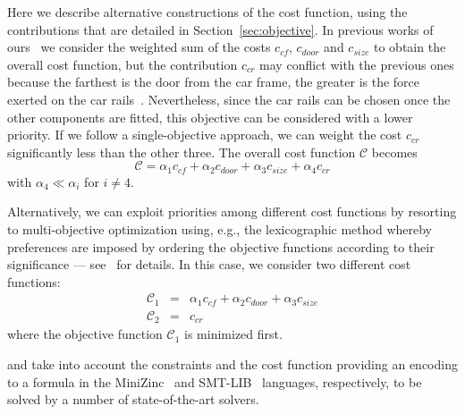 Here we describe alternative constructions of the cost function,
using the contributions that are detailed in Section~\ref{sec:objective}.
In previous works of ours~\cite{AiLift2} we consider the weighted sum 
of the costs $c_{cf}$, $c_{door}$ and $c_{size}$ to obtain the overall
cost function, but the contribution $c_{cr}$ may conflict with the
previous ones because the farthest is the door from the car frame, the
greater is the force exerted on the car rails~\cite{AiLift3, AiLift4}. 
Nevertheless, since the car rails can be chosen once the other components
are fitted, this objective can be considered with a lower priority. 
If we follow a single-objective approach, we can weight the cost $c_{cr}$
significantly less than the other three. The overall cost function
$\mathcal{C}$ becomes
\begin{equation}
	\label{eq:costfunc_single}
	\mathcal{C} = \alpha_1 c_{cf} + \alpha_2 c_{door} +  \alpha_3 c_{size}
	+ \alpha_4 c_{cr} 
\end{equation}
with $\alpha_4 \ll \alpha_i$ for $i \neq 4$.

Alternatively, we can exploit priorities among different cost
functions by resorting to multi-objective optimization using, e.g.,
the lexicographic method whereby preferences are imposed by ordering 
the objective functions according to their significance ---
see~\cite{CHANG20151105} for details.
In this case, we consider two different cost functions:
\begin{equation}
	\label{eq:costfunc_multi}
	\begin{array}{rcl}
		\mathcal{C}_1 & = & \alpha_1 c_{cf} + \alpha_2 c_{door} +
		\alpha_3 c_{size}\\
		\mathcal{C}_2 & = &c_{cr}
	\end{array}
\end{equation}
where the objective function $\mathcal{C}_1$ is minimized first.

\liftcreatecp{} and \liftcreatesmt{} take into account the constraints 
and the cost function providing an encoding to a formula in the 
MiniZinc~\cite{nethercote2007minizinc} and SMT-LIB~\cite{smtlib} 
languages, respectively, to be solved by a number of state-of-the-art 
solvers. 
